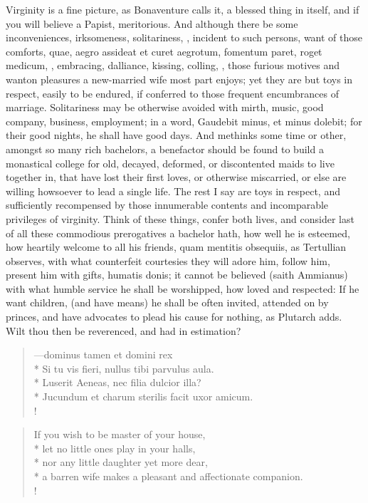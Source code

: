 Virginity is a fine picture, as Bonaventure calls it, a blessed
thing in itself, and if you will believe a Papist, meritorious. And
although there be some inconveniences, irksomeness, solitariness, \etc{},
incident to such persons, want of those comforts, quae, aegro assideat
et curet aegrotum, fomentum paret, roget medicum, \etc{}, embracing,
dalliance, kissing, colling, \etc{}, those furious motives and wanton
pleasures a new-married wife most part enjoys; yet they are but toys in
respect, easily to be endured, if conferred to those frequent
encumbrances of marriage. Solitariness may be otherwise avoided with
mirth, music, good company, business, employment; in a word,
Gaudebit minus, et minus dolebit; for their good nights, he shall
have good days. And methinks some time or other, amongst so many rich
bachelors, a benefactor should be found to build a monastical college
for old, decayed, deformed, or discontented maids to live together in,
that have lost their first loves, or otherwise miscarried, or else are
willing howsoever to lead a single life. The rest I say are toys in
respect, and sufficiently recompensed by those innumerable contents and
incomparable privileges of virginity. Think of these things, confer
both lives, and consider last of all these commodious prerogatives a
bachelor hath, how well he is esteemed, how heartily welcome to all his
friends, quam mentitis obsequiis, as Tertullian observes, with what
counterfeit courtesies they will adore him, follow him, present him
with gifts, humatis donis; it cannot be believed (saith Ammianus)
with what humble service he shall be worshipped, how loved and
respected: If he want children, (and have means) he shall be often
invited, attended on by princes, and have advocates to plead his cause
for nothing, as Plutarch adds. Wilt thou then be reverenced, and
had in estimation?
%
\begin{latin}%
\begin{verse}%
---dominus tamen et domini rex\\*
Si tu vis fieri, nullus tibi parvulus aula.\\*
Luserit Aeneas, nec filia dulcior illa?\\*
Jucundum et charum sterilis facit uxor amicum.\\!
\end{verse}%
\end{latin}%
\translationrule%
\begin{verse}%
If you wish to be master of your house,\\*
let no little ones play in your halls,\\*
nor any little daughter yet more dear,\\*
a barren wife makes a pleasant and affectionate companion.\\!
\end{verse}%
%

